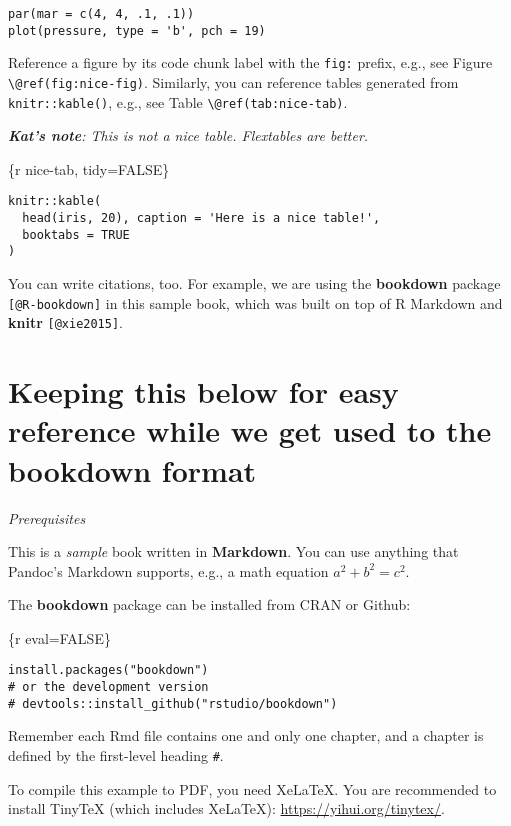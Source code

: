 \documentclass[
]{book}
\begin{document}
\begin{verbatim}
par(mar = c(4, 4, .1, .1))
plot(pressure, type = 'b', pch = 19)
\end{verbatim}

Reference a figure by its code chunk label with the \texttt{fig:} prefix, e.g., see Figure \texttt{\textbackslash{}@ref(fig:nice-fig)}. Similarly, you can reference tables generated from \texttt{knitr::kable()}, e.g., see Table \texttt{\textbackslash{}@ref(tab:nice-tab)}.

\emph{\textbf{Kat's note}: This is not a nice table. Flextables are better.}

\{r nice-tab, tidy=FALSE\}

\begin{verbatim}
knitr::kable(
  head(iris, 20), caption = 'Here is a nice table!',
  booktabs = TRUE
)
\end{verbatim}

You can write citations, too. For example, we are using the \textbf{bookdown} package \texttt{{[}@R-bookdown{]}} in this sample book, which was built on top of R Markdown and \textbf{knitr} \texttt{{[}@xie2015{]}}.

\section{Keeping this below for easy reference while we get used to the bookdown format}\label{keeping-this-below-for-easy-reference-while-we-get-used-to-the-bookdown-format}

\emph{Prerequisites}

This is a \emph{sample} book written in \textbf{Markdown}. You can use anything that Pandoc's Markdown supports, e.g., a math equation \(a^2 + b^2 = c^2\).

The \textbf{bookdown} package can be installed from CRAN or Github:

\{r eval=FALSE\}

\begin{verbatim}
install.packages("bookdown")
# or the development version
# devtools::install_github("rstudio/bookdown")
\end{verbatim}

Remember each Rmd file contains one and only one chapter, and a chapter is defined by the first-level heading \texttt{\#}.

To compile this example to PDF, you need XeLaTeX. You are recommended to install TinyTeX (which includes XeLaTeX): \url{https://yihui.org/tinytex/}.
\end{document}
